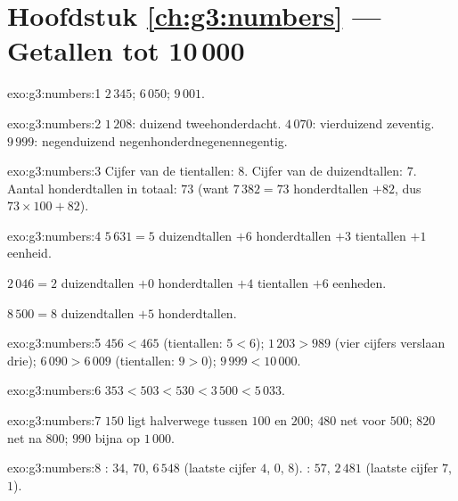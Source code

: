 \section*{Hoofdstuk \ref{ch:g3:numbers} --- Getallen tot 10\,000}

\begin{solution}{exo:g3:numbers:1}
$2\,345$; \quad $6\,050$; \quad $9\,001$.
\end{solution}

\begin{solution}{exo:g3:numbers:2}
$1\,208$: duizend tweehonderdacht. \quad
$4\,070$: vierduizend zeventig. \quad
$9\,999$: negenduizend negenhonderdnegenennegentig.
\end{solution}

\begin{solution}{exo:g3:numbers:3}
Cijfer van de tientallen: $8$. Cijfer van de duizendtallen: $7$. Aantal
honderdtallen in totaal: $73$ (want $7\,382 = 73$ honderdtallen $+ 82$,
dus $73 \times 100 + 82$).
\end{solution}

\begin{solution}{exo:g3:numbers:4}
$5\,631 = 5$ duizendtallen $+ 6$ honderdtallen $+ 3$ tientallen $+ 1$
eenheid.

$2\,046 = 2$ duizendtallen $+ 0$ honderdtallen $+ 4$ tientallen $+ 6$
eenheden.

$8\,500 = 8$ duizendtallen $+ 5$ honderdtallen.
\end{solution}

\begin{solution}{exo:g3:numbers:5}
$456 < 465$ (tientallen: $5 < 6$); \quad
$1\,203 > 989$ (vier cijfers verslaan drie); \quad
$6\,090 > 6\,009$ (tientallen: $9 > 0$); \quad
$9\,999 < 10\,000$.
\end{solution}

\begin{solution}{exo:g3:numbers:6}
$353 < 503 < 530 < 3\,500 < 5\,033$.
\end{solution}

\begin{solution}{exo:g3:numbers:7}
$150$ ligt halverwege tussen $100$ en $200$; $480$ net voor $500$; $820$
net na $800$; $990$ bijna op $1\,000$.
\end{solution}

\begin{solution}{exo:g3:numbers:8}
: $34$, $70$, $6\,548$ (laatste cijfer $4$, $0$, $8$). : $57$,
$2\,481$ (laatste cijfer $7$, $1$).
\end{solution}

